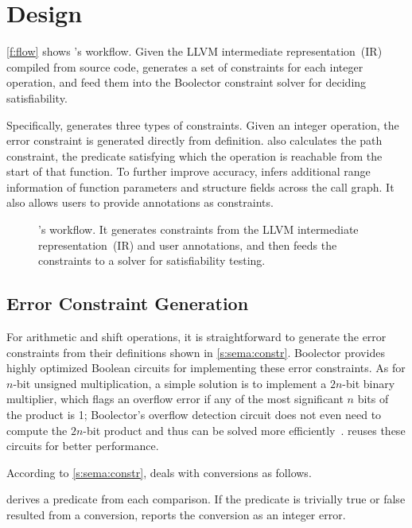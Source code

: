 \section{Design}
\label{s:gen}

\autoref{f:flow} shows \sys's workflow.  Given the LLVM intermediate
representation~(IR) compiled from source code, \sys generates a set
of constraints for each integer operation, and feed them into the
Boolector constraint solver for deciding satisfiability.

Specifically, \sys generates three types of constraints.
%
Given an integer operation, the error constraint is generated
directly from definition.
%
\sys also calculates the path constraint, the predicate satisfying
which the operation is reachable from the start of that function.
%
To further improve accuracy, \sys infers additional range information
of function parameters and structure fields across the call graph.
It also allows users to provide annotations as constraints.

\begin{figure}
\centering
\resizebox{0.9\linewidth}{!}{

}
\caption{\sys's workflow.  It generates constraints from the LLVM
intermediate representation~(IR) and user annotations, and then feeds
the constraints to a solver for satisfiability testing.}
\label{f:flow}
\end{figure}

\subsection{Error Constraint Generation}

For arithmetic and shift operations, it is straightforward to
generate the error constraints from their definitions shown in
\autoref{s:sema:constr}.  Boolector provides highly optimized Boolean
circuits for implementing these error constraints.  As for $n$-bit
unsigned multiplication, a simple solution is to implement a $2n$-bit
binary multiplier, which flags an overflow error if any of the most
significant $n$ bits of the product is 1; Boolector's overflow
detection circuit does not even need to compute the $2n$-bit product
and thus can be solved more
efficiently~\cite[\chapterautorefname~3.5]{brummayer:phd}.  \sys
reuses these circuits for better performance.

According to \autoref{s:sema:constr}, \sys deals with conversions as follows.

\sys derives a predicate from each comparison.  If the predicate
is trivially true or false resulted from a conversion, \sys reports
the conversion as an integer error.

